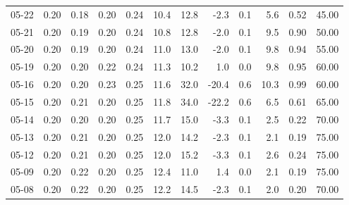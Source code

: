 \begin{threeparttable}
{\begin{tabular}{lrrrrrrrrrrr}
  05-22 &          0.20 &          0.18 &          0.20 &        0.24 &                10.4 &                12.8 &       -2.3 &                 0.1 &              5.6 &            0.52 &                  45.00 \\
  05-21 &          0.20 &          0.19 &          0.20 &        0.24 &                10.8 &                12.8 &       -2.0 &                 0.1 &              9.5 &            0.90 &                  50.00 \\
  05-20 &          0.20 &          0.19 &          0.20 &        0.24 &                11.0 &                13.0 &       -2.0 &                 0.1 &              9.8 &            0.94 &                  55.00 \\
  05-19 &          0.20 &          0.20 &          0.22 &        0.24 &                11.3 &                10.2 &        1.0 &                 0.0 &              9.8 &            0.95 &                  60.00 \\
  05-16 &          0.20 &          0.20 &          0.23 &        0.25 &                11.6 &                32.0 &      -20.4 &                 0.6 &             10.3 &            0.99 &                  60.00 \\
  05-15 &          0.20 &          0.21 &          0.20 &        0.25 &                11.8 &                34.0 &      -22.2 &                 0.6 &              6.5 &            0.61 &                  65.00 \\
  05-14 &          0.20 &          0.20 &          0.20 &        0.25 &                11.7 &                15.0 &       -3.3 &                 0.1 &              2.5 &            0.22 &                  70.00 \\
  05-13 &          0.20 &          0.21 &          0.20 &        0.25 &                12.0 &                14.2 &       -2.3 &                 0.1 &              2.1 &            0.19 &                  75.00 \\
  05-12 &          0.20 &          0.21 &          0.20 &        0.25 &                12.0 &                15.2 &       -3.3 &                 0.1 &              2.6 &            0.24 &                  75.00 \\
  05-09 &          0.20 &          0.22 &          0.20 &        0.25 &                12.4 &                11.0 &        1.4 &                 0.0 &              2.1 &            0.19 &                  75.00 \\
  05-08 &          0.20 &          0.22 &          0.20 &        0.25 &                12.2 &                14.5 &       -2.3 &                 0.1 &              2.0 &            0.20 &                  70.00 \\

\end{tabular}}
\end{threeparttable}
